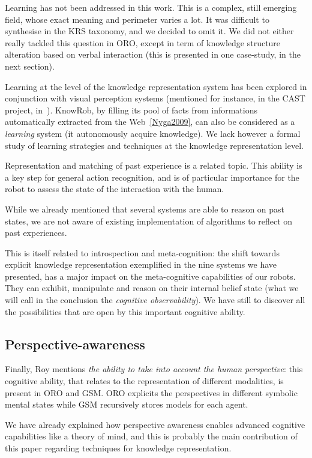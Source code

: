\documentclass{IEEEtran}
\begin{document}
Learning has not been addressed in this work. This is a complex, still emerging
field, whose exact meaning and perimeter varies a lot. It was difficult to
synthesise in the KRS taxonomy, and we decided to omit it. We did not either
really tackled this question in ORO, except in term of knowledge structure
alteration based on verbal interaction (this is presented in one case-study, in
the next section).

Learning at the level of the knowledge representation system has been explored
in conjunction with visual perception systems (mentioned for instance, in the
CAST project, in~\cite{Jakobsson2008}). {\sc KnowRob}, by filling its pool of
facts from informations automatically extracted from the Web~\ref{Nyga2009},
can also be considered as a \emph{learning} system (it autonomously acquire
knowledge). We lack however a formal study of learning strategies and
techniques at the knowledge representation level.

Representation and matching of past experience is a related topic. This ability
is a key step for general action recognition, and is of particular importance
for the robot to assess the state of the interaction with the human.

While we already mentioned that several systems are able to reason on past
states, we are not aware of existing implementation of algorithms to reflect on
past experiences.

This is itself related to introspection and meta-cognition: the shift towards
explicit knowledge representation exemplified in the nine systems we have
presented, has a major impact on the meta-cognitive capabilities of our robots.
They can exhibit, manipulate and reason on their internal belief state (what we
will call in the conclusion the \emph{cognitive observability}). We have still
to discover all the possibilities that are open by this important cognitive
ability.

\subsection{Perspective-awareness}

Finally, Roy mentions \emph{the ability to take into account the human
perspective}: this cognitive ability, that relates to the representation of
different modalities, is present in ORO and GSM. ORO explicits the perspectives
in different symbolic mental states while GSM recursively stores models for
each agent.

We have already explained how perspective awareness enables advanced cognitive
capabilities like a theory of mind, and this is probably the main contribution
of this paper regarding techniques for knowledge representation.
\end{document}
